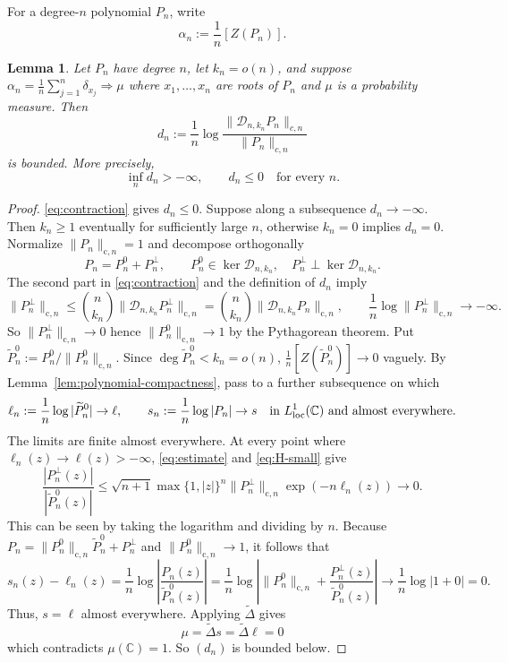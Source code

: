 \documentclass[10pt,reqno]{amsart}
\newtheorem{lemma}[theorem]{Lemma}
\theoremstyle{remark}
\newcommand{\C}{\mathbb C}
\newcommand{\D}{\mathcal D}
\newcommand{\weak}{\Rightarrow}
\begin{document}
For a degree-$n$ polynomial $P_n$, write
\[\alpha_n:=\frac{1}{n}[Z(P_n)].\]

\begin{lemma}\label{lem:no-escape}
    Let $P_n$ have degree $n$, let $k_n=o(n)$, and suppose $\alpha_n=\frac{1}{n}\sum_{j=1}^n \delta_{x_j}\weak \mu$ where $x_1,\ldots, x_n$ are roots of $P_n$ and $\mu$ is a probability measure. Then
    \[d_n:=\frac{1}{n}\log\frac{\|\D_{n,k_n}P_n\|_{c,n}}{\|P_n\|_{c,n}}\]
    is bounded. More precisely,
    \[\inf_n d_n>-\infty,\qquad d_n\le0\quad\text{for every }n.\]
\end{lemma}

\begin{proof}
    \eqref{eq:contraction} gives $d_n\le 0$. Suppose along a subsequence $d_n\to -\infty$. Then $k_n\ge 1$ eventually for sufficiently large $n$, otherwise $k_n=0$ implies $d_n=0$. Normalize $\|P_n\|_{\mathrm{c},n}=1$ and decompose orthogonally
    \[P_n=P_n^0+P_n^\perp,\qquad P_n^0\in\ker\D_{n,k_n},\quad P_n^\perp\perp \ker\D_{n,k_n}.\]
    The second part in \eqref{eq:contraction} and the definition of $d_n$ imply 
    \begin{equation}\label{eq:H-small}
    \|P_n^{\perp}\|_{\mathrm{c},n}\le 
    \binom{n}{k_n}\|\D_{n,k_n}P_n^\perp\|_{\mathrm{c},n} =
    \binom{n}{k_n}\|\D_{n,k_n}P_n\|_{\mathrm{c},n},\qquad
    \frac{1}{n}\log\|P_n^{\perp}\|_{\mathrm{c},n}\to -\infty.
    \end{equation}
    So $\|P_n^\perp\|_{\mathrm{c},n}\to 0$ hence $\|P_n^0\|_{\mathrm{c},n}\to 1$ by the Pythagorean theorem. Put $\widetilde{P}_n^0:=P_n^0/\|P_n^0\|_{\mathrm{c},n}$. Since $\deg\widetilde{P}_n^0<k_n=o(n)$, $\frac{1}{n}[Z(\widetilde{P}_n^0)]\to 0$ vaguely. By Lemma~\ref{lem:polynomial-compactness}, pass to a further subsequence on which
    \[\ell_n:=\frac{1}{n}\log|\widetilde{P}_n^0|\to \ell,\qquad s_n:=\frac{1}{n}\log|P_n|\to s\quad\text{in }L_{\rm loc}^1(\C)\text{ and almost everywhere}.\]
    The limits are finite almost everywhere. At every point where $\ell_n(z)\to \ell(z)>-\infty$, \eqref{eq:estimate} and \eqref{eq:H-small} give
    \[\frac{|P_n^\perp(z)|}{|\widetilde{P}_n^0(z)|}\le\sqrt{n+1}\max\{1,|z|\}^n\|P_n^\perp\|_{\mathrm{c},n}\exp(-n\ell_n(z))\to 0.\] This can be seen by taking the logarithm and dividing by $n$. Because $P_n=\|P_n^0\|_{\mathrm{c},n}\widetilde{P}_n^0+P_n^\perp$ and $\|P_n^0\|_{\mathrm{c},n}\to 1$, it follows that 
    \[s_n(z)-\ell_n(z)=\frac{1}{n}\log\left|\frac{P_n(z)}{\widetilde{P}_n^0(z)}\right|=\frac{1}{n}\log\left|\|P_n^0\|_{\mathrm{c},n}+\frac{P_n^\perp(z)}{\widetilde{P}_n^0(z)}\right|\to \frac{1}{n}\log|1+0|=0.\]
    Thus, $s=\ell$ almost everywhere. Applying $\widetilde{\Delta}$ gives 
    \[\mu=\widetilde{\Delta}s=\widetilde{\Delta}\ell=0\] 
    which contradicts $\mu(\C)=1$. So $(d_n)$ is bounded below.
\end{proof}
\end{document}
